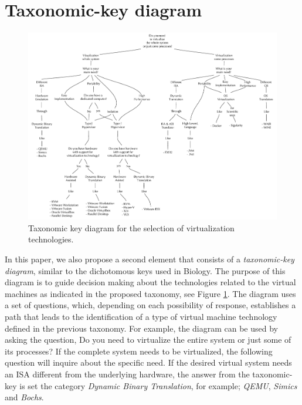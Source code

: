 \section {Taxonomic-key diagram}           \label{sec:choosingVirtualizationTechnology}
	\begin{figure}[ht]
		\centering
		\includegraphics[width=18cm]{images/taxonomic-KeyDiagramV2.pdf}
		\vspace{-0.2cm}
		\caption{Taxonomic key diagram for the selection of virtualization technologies.}
		\label{fig:taxonomic-keyDiagram}
	\end{figure}
	
	In this paper, we also propose a second element that consists of a \textit{taxonomic-key diagram}, similar to the dichotomous keys used in Biology. The purpose of this diagram is to guide decision making about the technologies related to the virtual machines as indicated in the proposed taxonomy, see Figure \ref{fig:taxonomic-keyDiagram}. The diagram uses a set of questions, which, depending on each possibility of response,  establishes a path that leads to the identification of a type of virtual machine technology defined in the previous taxonomy. For example, the diagram can be used by asking the question, Do you need to virtualize the entire system or just some of its processes? If the complete system needs to be virtualized, the following question will inquire about the specific need. If the desired virtual system needs an ISA different from the underlying hardware, the answer from the taxonomic-key is set the category \textit {Dynamic Binary Translation}, for example; \textit{QEMU}, \textit{Simics} and \textit{Bochs}. 
